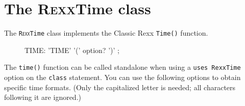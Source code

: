 \section{The R\textsc{exx}Time class}\label{refrexxtime}
 
The \texttt{R\textsc{exx}Time} class implements the Classic Rexx \texttt{Time()} function.
\begin{figure}[h]
   \begin{shaded}
\begin{rail}
  TIME:  'TIME' '('   option?  ')'
  ;
\end{rail}
 \end{shaded}
\end{figure}

The \texttt{time()} function can be called standalone when using a \texttt{uses RexxTime} option on the \texttt{class} statement. You can use the following options to obtain specific time formats. (Only the capitalized letter is needed; all characters following it are ignored.)
